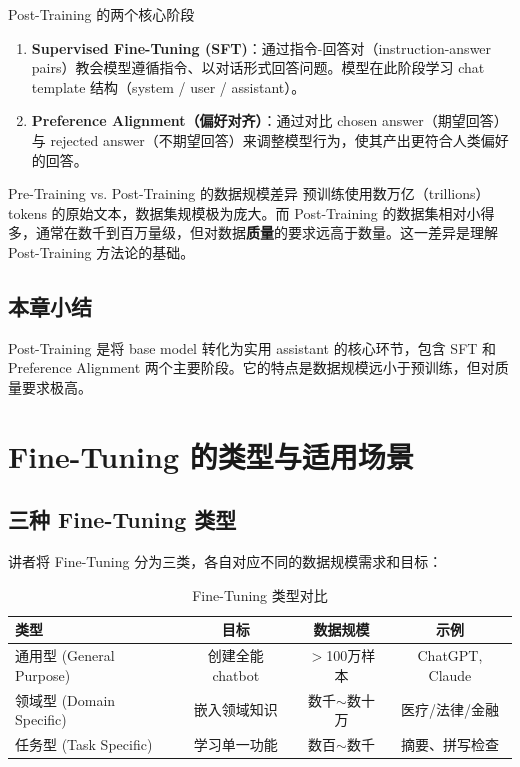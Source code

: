 \documentclass[a4paper]{article}
\begin{document}
\begin{importantbox}{Post-Training 的两个核心阶段}
\begin{enumerate}
    \item \textbf{Supervised Fine-Tuning (SFT)}：通过指令-回答对（instruction-answer pairs）教会模型遵循指令、以对话形式回答问题。模型在此阶段学习 chat template 结构（system / user / assistant）。
    \item \textbf{Preference Alignment（偏好对齐）}：通过对比 chosen answer（期望回答）与 rejected answer（不期望回答）来调整模型行为，使其产出更符合人类偏好的回答。
\end{enumerate}
\end{importantbox}

\begin{knowledgebox}{Pre-Training vs. Post-Training 的数据规模差异}
预训练使用数万亿（trillions）tokens 的原始文本，数据集规模极为庞大。而 Post-Training 的数据集相对小得多，通常在数千到百万量级，但对数据\textbf{质量}的要求远高于数量。这一差异是理解 Post-Training 方法论的基础。
\end{knowledgebox}

\subsection{本章小结}

Post-Training 是将 base model 转化为实用 assistant 的核心环节，包含 SFT 和 Preference Alignment 两个主要阶段。它的特点是数据规模远小于预训练，但对质量要求极高。

\newpage
\section{Fine-Tuning 的类型与适用场景}

\subsection{三种 Fine-Tuning 类型}

讲者将 Fine-Tuning 分为三类，各自对应不同的数据规模需求和目标：

\begin{table}[H]
\centering
\caption{Fine-Tuning 类型对比}
\begin{tabular}{lccc}
\toprule
\textbf{类型} & \textbf{目标} & \textbf{数据规模} & \textbf{示例} \\
\midrule
通用型 (General Purpose) & 创建全能 chatbot & $>$100万样本 & ChatGPT, Claude \\
领域型 (Domain Specific) & 嵌入领域知识 & 数千$\sim$数十万 & 医疗/法律/金融 \\
任务型 (Task Specific) & 学习单一功能 & 数百$\sim$数千 & 摘要、拼写检查 \\
\bottomrule
\end{tabular}
\end{table}
\end{document}
